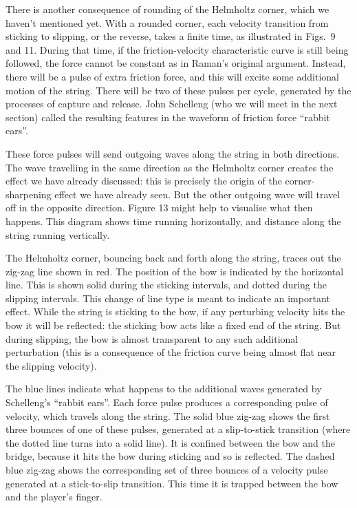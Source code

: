   There is another consequence of rounding of the Helmholtz corner, which we 
  haven’t mentioned yet. With a rounded corner, each velocity transition from 
  sticking to slipping, or the reverse, takes a finite time, as illustrated in 
  Figs.\ 9 and 11. During that time, if the friction-velocity characteristic 
  curve is still being followed, the force cannot be constant as in Raman's 
  original argument. Instead, there will be a pulse of extra friction force, 
  and this will excite some additional motion of the string. There will be two 
  of these pulses per cycle, generated by the processes of capture and release. 
  John Schelleng (who we will meet in the next section) called the resulting 
  features in the waveform of friction force “rabbit ears”. 

  These force pulses will send outgoing waves along the string in both 
  directions. The wave travelling in the same direction as the Helmholtz corner 
  creates the effect we have already discussed: this is precisely the origin of 
  the corner-sharpening effect we have already seen. But the other outgoing 
  wave will travel off in the opposite direction. Figure 13 might help to 
  visualise what then happens. This diagram shows time running horizontally, 
  and distance along the string running vertically. 

  The Helmholtz corner, bouncing back and forth along the string, traces out 
  the zig-zag line shown in red. The position of the bow is indicated by the 
  horizontal line. This is shown solid during the sticking intervals, and 
  dotted during the slipping intervals. This change of line type is meant to 
  indicate an important effect. While the string is sticking to the bow, if any 
  perturbing velocity hits the bow it will be reflected: the sticking bow acts 
  like a fixed end of the string. But during slipping, the bow is almost 
  transparent to any such additional perturbation (this is a consequence of the 
  friction curve being almost flat near the slipping velocity). 

  The blue lines indicate what happens to the additional waves generated by 
  Schelleng’s “rabbit ears”. Each force pulse produces a corresponding pulse of 
  velocity, which travels along the string. The solid blue zig-zag shows the 
  first three bounces of one of these pulses, generated at a slip-to-stick 
  transition (where the dotted line turns into a solid line). It is confined 
  between the bow and the bridge, because it hits the bow during sticking and 
  so is reflected. The dashed blue zig-zag shows the corresponding set of three 
  bounces of a velocity pulse generated at a stick-to-slip transition. This 
  time it is trapped between the bow and the player’s finger. 


